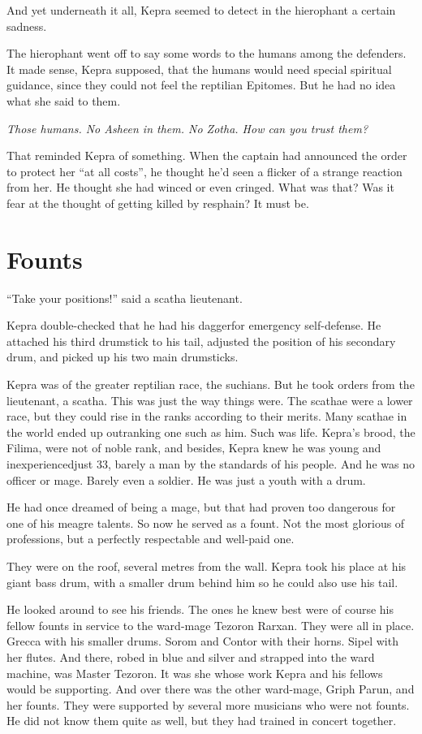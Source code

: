 \documentclass
  [a4paper,
   12pt,
   oneside
  ]%
  {article}
\begin{document}
And yet underneath it all, Kepra seemed to detect in the hierophant a certain sadness.

The hierophant went off to say some words to the humans among the defenders. 
It made sense, Kepra supposed, that the humans would need special spiritual guidance, since they could not feel the reptilian Epitomes. But he had no idea what she said to them.

\emph{Those humans. No Asheen in them. No Zotha. How can you trust them?}

That reminded Kepra of something. 
When the captain had announced the order to protect her ``at all costs'', he thought he'd seen a flicker of a strange reaction from her. 
He thought she had winced or even cringed. 
What was that? 
Was it fear at the thought of getting killed by resphain? 
It must be.



\section{Founts}
``Take your positions!'' said a scatha lieutenant. 

Kepra double-checked that he had his dagger\dash{}for emergency self-defense. 
He attached his third drumstick to his tail, 
adjusted the position of his secondary drum,
and picked up his two main drumsticks.

Kepra was of the greater reptilian race, the suchians. 
But he took orders from the lieutenant, a scatha. 
This was just the way things were. 
The scathae were a lower race, but they could rise in the ranks according to their merits. 
Many scathae in the world ended up outranking one such as him.
Such was life.
Kepra’s brood, the Filima, were not of noble rank, and besides, Kepra knew he was young and inexperienced\dash{}just 33, barely a man by the standards of his people. 
And he was no officer or mage. 
Barely even a soldier. 
He was just a youth with a drum. 

He had once dreamed of being a mage, but that had proven too dangerous for one of his meagre talents. 
So now he served as a fount. Not the most glorious of professions, but a perfectly respectable and well-paid one.

They were on the roof, several metres from the wall. 
Kepra took his place at his giant bass drum, with a smaller drum behind him so he could also use his tail. 

He looked around to see his friends. 
The ones he knew best were of course his fellow founts in service to the ward-mage Tezoron Rarxan. 
They were all in place. Grecca with his smaller drums. Sorom and Contor with their horns. Sipel with her flutes. 
And there, robed in blue and silver and strapped into the ward machine, was Master Tezoron. 
It was she whose work Kepra and his fellows would be supporting. And over there was the other ward-mage, Griph Parun, and her founts. 
They were supported by several more musicians who were not founts.
He did not know them quite as well, but they had trained in concert together. 
\end{document}

